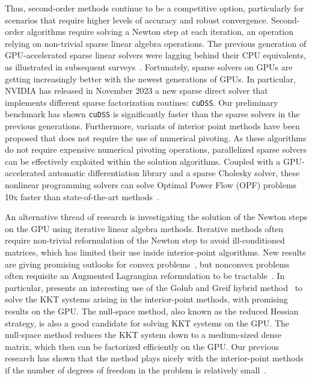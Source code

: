 Thus, second-order methods continue to be a competitive option, particularly
for scenarios that require higher levels of accuracy and robust convergence.
Second-order algorithms require solving a Newton step at each
iteration, an operation relying on non-trivial sparse linear algebra operations.
The previous generation of GPU-accelerated sparse linear
solvers were lagging behind their CPU equivalents, as illustrated in
subsequent surveys~\cite{tasseff2019exploring,swirydowicz2021linear}.
Fortunately, sparse solvers on GPUs are getting increasingly better with the newest
generations of GPUs. In particular, NVIDIA has released in November 2023
a new sparse direct solver that implements different sparse factorization routines: {\tt cuDSS}. Our
preliminary benchmark has shown {\tt cuDSS} is significantly
faster than the sparse solvers in the previous generations.
Furthermore, variants of interior point methods have been proposed
that does not require the use of numerical pivoting.
As these algorithms do not require expensive numerical pivoting
operations, parallelized sparse solvers can be effectively exploited
within the solution algorithms.
Coupled with a GPU-accelerated automatic differentiation library and a
sparse Cholesky solver, these nonlinear programming solvers can solve
Optimal Power Flow (OPF) problems 10x faster than state-of-the-art
methods~\cite{shin2023accelerating}.

An alternative thread of research is investigating the solution of the Newton steps
on the GPU using iterative linear algebra methods.
Iterative methods often require non-trivial reformulation of the Newton step to avoid
ill-conditioned matrices, which has limited their use inside interior-point
algorithms. New results are giving promising outlooks for convex problems~\cite{ghannad2022linear},
but nonconvex problems often requisite an Augmented Lagrangian reformulation
to be tractable~\cite{cao2016augmented,regev2023hykkt}. In particular,
\cite{regev2023hykkt} presents an interesting use of the Golub and Greif
hybrid method~\cite{golub2003solving} to solve the KKT systems arising in
the interior-point methods, with promising results on the GPU.
The null-space method, also known as the reduced Hessian strategy,
is also a good candidate for solving KKT systems on the GPU.
The null-space method reduces the KKT system down to
a medium-sized dense matrix, which then can be factorized efficiently on the GPU.
Our previous research has shown that the method plays nicely with the interior-point
methods if the number of degrees of freedom in the problem is relatively small~\cite{pacaud2022condensed}.

